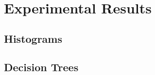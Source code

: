 \section{Experimental Results}\label{s:results}

\subsection{Histograms}\label{ss:results-histograms}


\subsection{Decision Trees}\label{ss:results-dtrees}


